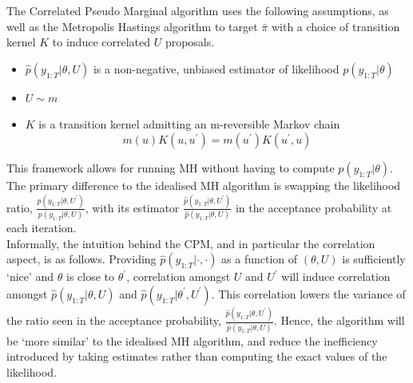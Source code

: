 \documentclass{article}
\begin{document}
The Correlated Pseudo Marginal algorithm uses the following assumptions, as well as the Metropolis Hastings algorithm to target $\bar{\pi}$ with a choice of transition kernel $K$ to induce correlated $U$ proposals.
\begin{itemize}
 \item $\hat{p}(y_{1:T}| \theta, U)$ is a non-negative, unbiased estimator of likelihood $p(y_{1:T}| \theta)$
 \item $U \sim m$
 \item $K$ is a transition kernel admitting an m-reversible Markov chain $$ m(u)K(u,u^\prime) = m(u^\prime)K(u^\prime, u)$$
\end{itemize}


This framework allows for running MH without having to compute $p(y_{1:T}| \theta)$. The primary difference to the idealised MH algorithm is swapping the likelihood ratio, $\frac{ p(y_{1:T}| \theta, U^\prime)}{ p(y_{1:T}| \theta, U)}$, with its estimator $\frac{ \hat{p}(y_{1:T}| \theta, U^\prime)}{ \hat{p}(y_{1:T}| \theta, U)}$ in the acceptance probability at each iteration. \\

Informally, the intuition behind the CPM, and in particular the correlation aspect, is as follows. Providing $\hat{p}(y_{1:T}| \cdot, \cdot)$ as a function of $(\theta, U)$ is sufficiently `nice' and $\theta$ is close to $\theta^\prime$, correlation amongst $U$ and $U^\prime$ will induce correlation amongst $\hat{p}(y_{1:T}| \theta, U)$ and $\hat{p}(y_{1:T}| \theta^\prime, U^\prime)$. This correlation lowers the variance of the ratio seen in the acceptance probability, $\frac{ \hat{p}(y_{1:T}| \theta, U^\prime)}{ \hat{p}(y_{1:T}| \theta, U)}$. Hence, the algorithm will be `more similar' to the idealised MH algorithm, and reduce the inefficiency introduced by taking estimates rather than computing the exact values of the likelihood.
\end{document}
